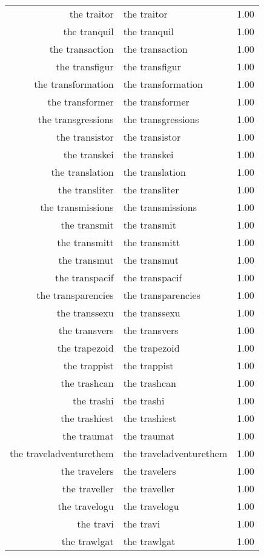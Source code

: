 \begin{table}[ht]
\begin{tabular}{rlr}
  the traitor & the traitor & 1.00 \\ 
  the tranquil & the tranquil & 1.00 \\ 
  the transaction & the transaction & 1.00 \\ 
  the transfigur & the transfigur & 1.00 \\ 
  the transformation & the transformation & 1.00 \\ 
  the transformer & the transformer & 1.00 \\ 
  the transgressions & the transgressions & 1.00 \\ 
  the transistor & the transistor & 1.00 \\ 
  the transkei & the transkei & 1.00 \\ 
  the translation & the translation & 1.00 \\ 
  the transliter & the transliter & 1.00 \\ 
  the transmissions & the transmissions & 1.00 \\ 
  the transmit & the transmit & 1.00 \\ 
  the transmitt & the transmitt & 1.00 \\ 
  the transmut & the transmut & 1.00 \\ 
  the transpacif & the transpacif & 1.00 \\ 
  the transparencies & the transparencies & 1.00 \\ 
  the transsexu & the transsexu & 1.00 \\ 
  the transvers & the transvers & 1.00 \\ 
  the trapezoid & the trapezoid & 1.00 \\ 
  the trappist & the trappist & 1.00 \\ 
  the trashcan & the trashcan & 1.00 \\ 
  the trashi & the trashi & 1.00 \\ 
  the trashiest & the trashiest & 1.00 \\ 
  the traumat & the traumat & 1.00 \\ 
  the traveladventurethem & the traveladventurethem & 1.00 \\ 
  the travelers & the travelers & 1.00 \\ 
  the traveller & the traveller & 1.00 \\ 
  the travelogu & the travelogu & 1.00 \\ 
  the travi & the travi & 1.00 \\ 
  the trawlgat & the trawlgat & 1.00 \\ 

\end{tabular}
\end{table}
